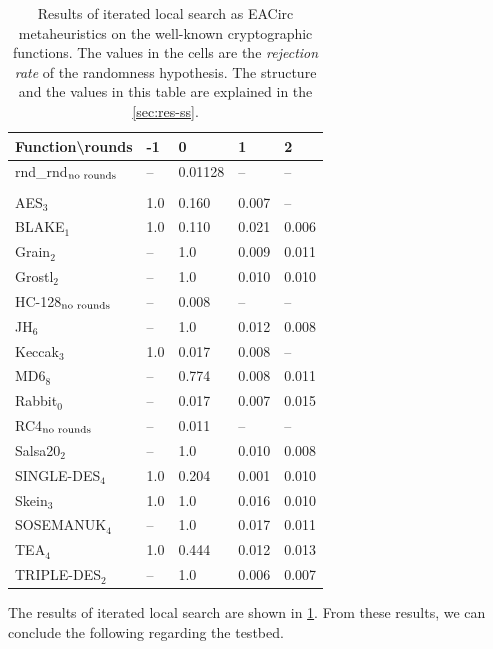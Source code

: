 \documentclass[
  print, %
  Table,   %
  nolof,     %
  nolot,     %
  11pt, %
  oneside  %
]{fithesis3}
\newcommand{\fd}{\cellcolor{red!13}}
\newcommand{\fn}{\cellcolor{green!13}}
\begin{document}
\begin{table}[t]
\centering
\begin{tabular}{l|l l l l}
Function\textbackslash{}rounds & -1 & 0 & 1 & 2\\ \hline
rnd\_rnd$_{\textnormal{no rounds}}$ & --  & \fn{}0.01128& --   & -- \\\\
AES$_{3}$        & \fd{}1.0   & \fd{}0.160 & \fn{}0.007 & \fn{}--   \\
BLAKE$_{1}$      & \fd{}1.0   & \fd{}0.110 & \fn{}0.021 & \fn{}0.006\\
Grain$_{2}$      & \fd{}--    & \fd{}1.0   & \fn{}0.009 & \fn{}0.011\\
Grostl$_{2}$     & \fd{}--    & \fd{}1.0   & \fn{}0.010 & \fn{}0.010\\
HC-128$_{\textnormal{no rounds}}$& -- & \fn{}0.008 & -- & --        \\
JH$_{6}$         & \fd{}--    & \fd{}1.0   & \fn{}0.012 & \fn{}0.008\\
Keccak$_{3}$     & \fd{}1.0   & \fn{}0.017 & \fn{}0.008 & \fn{}--   \\
MD6$_{8}$        & \fd{}--    & \fd{}0.774 & \fn{}0.008 & \fn{}0.011\\
Rabbit$_{0}$     &      --    & \fn{}0.017 & \fn{}0.007 & \fn{}0.015\\
RC4$_{\textnormal{no rounds}}$& -- & \fn{}0.011 & --    & --        \\
Salsa20$_{2}$    & \fd{}--    & \fd{}1.0   & \fn{}0.010 & \fn{}0.008\\
SINGLE-DES$_{4}$ & \fd{}1.0   & \fd{}0.204 & \fn{}0.001 & \fn{}0.010\\
Skein$_{3}$      & \fd{}1.0   & \fd{}1.0   & \fn{}0.016 & \fn{}0.010\\
SOSEMANUK$_{4}$  & \fd{}--    & \fd{}1.0   & \fn{}0.017 & \fn{}0.011\\
TEA$_{4}$        & \fd{}1.0   & \fd{}0.444 & \fn{}0.012 & \fn{}0.013\\
TRIPLE-DES$_{2}$ & \fd{}--    & \fd{}1.0   & \fn{}0.006 & \fn{}0.007
\end{tabular}
\caption{Results of iterated local search as EACirc metaheuristics on the well-known cryptographic functions. The values in the cells are the \textit{rejection rate} of the randomness hypothesis. The structure and the values in this table are explained in the \cref{sec:res-ss}.}
\label{table:res-usable-ils}
\end{table}

The results of iterated local search are shown in \cref{table:res-usable-ils}. From these results, we can conclude the following regarding the testbed.
\end{document}
